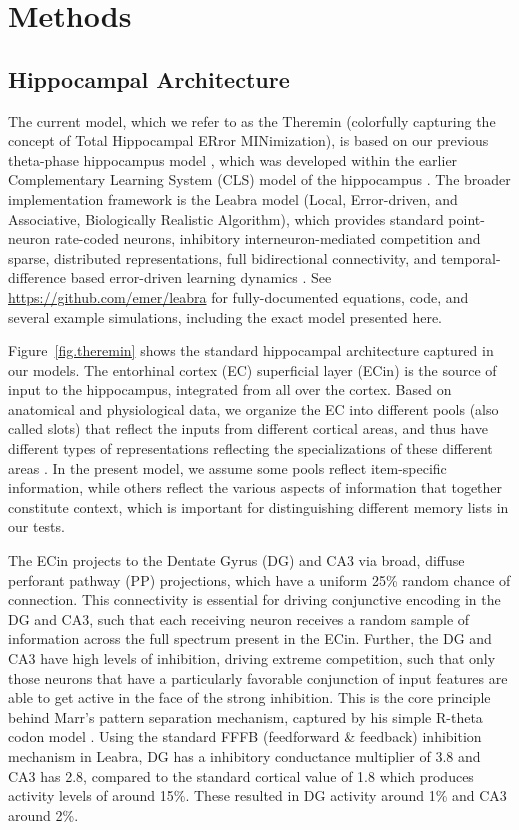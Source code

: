 \documentclass[11pt,twoside]{article}
\newif\myifpdf
\begin{document}
\section{Methods}

\subsection{Hippocampal Architecture}

The current model, which we refer to as the Theremin (colorfully capturing the concept of Total Hippocampal ERror MINimization), is based on our previous theta-phase hippocampus model \citep{KetzMorkondaOReilly13}, which was developed within the earlier Complementary Learning System (CLS) model of the hippocampus \citep{NormanOReilly03,OReillyRudy01}.  The broader implementation framework is the Leabra model (Local, Error-driven, and Associative, Biologically Realistic Algorithm), which provides standard point-neuron rate-coded neurons, inhibitory interneuron-mediated competition and sparse, distributed representations, full bidirectional connectivity, and temporal-difference based error-driven learning dynamics \citep{OReillyMunakata00,OReillyMunakataFrankEtAl12}.  See \url{https://github.com/emer/leabra} for fully-documented equations, code, and several example simulations, including the exact model presented here.

Figure~\ref{fig.theremin} shows the standard hippocampal architecture captured in our models. The entorhinal cortex (EC) superficial layer (ECin) is the source of input to the hippocampus, integrated from all over the cortex.  Based on anatomical and physiological data, we organize the EC into different pools (also called slots) that reflect the inputs from different cortical areas, and thus have different types of representations reflecting the specializations of these different areas \citep{WitterDoanJacobsenEtAl17}.  In the present model, we assume some pools reflect item-specific information, while others reflect the various aspects of information that together constitute context, which is important for distinguishing different memory lists in our tests.

The ECin projects to the Dentate Gyrus (DG) and CA3 via broad, diffuse perforant pathway (PP) projections, which have a uniform 25\% random chance of connection.  This connectivity is essential for driving conjunctive encoding in the DG and CA3, such that each receiving neuron receives a random sample of information across the full spectrum present in the ECin.  Further, the DG and CA3 have high levels of inhibition, driving extreme competition, such that only those neurons that have a particularly favorable conjunction of input features are able to get active in the face of the strong inhibition.  This is the core principle behind Marr's pattern separation mechanism, captured by his simple R-theta codon model \citep{Marr71}.  Using the standard FFFB (feedforward \& feedback) inhibition mechanism in Leabra, DG has a inhibitory conductance multiplier of 3.8 and CA3 has 2.8, compared to the standard cortical value of 1.8 which produces activity levels of around 15\%.  These resulted in DG activity around 1\% and CA3 around 2\%.
\end{document}
